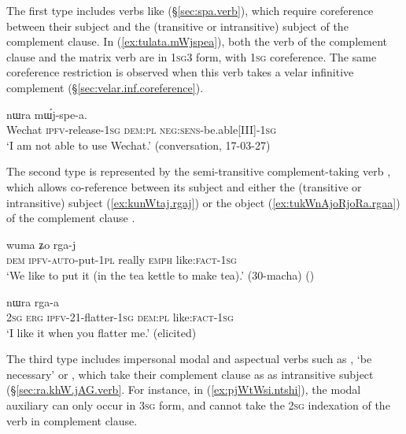 The first type includes verbs like  (§\ref{sec:spa.verb}), which require coreference between their subject and the (transitive or intransitive) subject of the complement clause. In (\ref{ex:tulata.mWjspea}), both the verb of the complement clause and the matrix verb are in \textsc{1sg}\fl{}3 form, with \textsc{1sg} coreference. The same coreference restriction is observed when this verb takes a velar infinitive complement (§\ref{sec:velar.inf.coreference}).
 
\begin{exe}
\ex \label{ex:tulata.mWjspea}
  nɯra mɯ́j-spe-a. \\
 Wechat \textsc{ipfv}-release-\textsc{1sg} \textsc{dem}:\textsc{pl} \textsc{neg}:\textsc{sens}-be.able[III]-\textsc{1sg} \\
 \glt `I am not able to use Wechat.' (conversation, 17-03-27)
  \end{exe}
 
The second type is represented by the semi-transitive complement-taking verb , which allows co-reference between its subject and either the (transitive or intransitive) subject (\ref{ex:kunWtaj.rgaj}) or the object (\ref{ex:tukWnAjoRjoRa.rgaa}) of the complement clause \citep[238]{jacques16complementation}. 
   
\begin{exe}
\ex \label{ex:kunWtaj.rgaj}
 \gll [nɯ ku-nɯ-ta-j] wuma ʑo rga-j   \\
 \textsc{dem} \textsc{ipfv}-\textsc{auto}-put-\textsc{1pl} really \textsc{emph} like:\textsc{fact}-\textsc{1sg} \\
 \glt `We like to put it (in the tea kettle to make tea).' (30-macha)
 ()
\end{exe}
     
 \begin{exe}
\ex \label{ex:tukWnAjoRjoRa.rgaa}
  nɯra rga-a \\
 \textsc{2sg} \textsc{erg} \textsc{ipfv}-2\fl{}1-flatter-\textsc{1sg} \textsc{dem}:\textsc{pl}  like:\textsc{fact}-\textsc{1sg}\\
\glt `I like it when you flatter me.' (elicited)
 \end{exe}
 
 The third type includes impersonal modal and aspectual verbs such as , `be necessary' or , which take their complement clause as as intransitive subject (§\ref{sec:ra.khW.jAG.verb}. For instance, in (\ref{ex:pjWtWsi.ntshi}), the modal auxiliary  can only occur in \textsc{3sg} form, and cannot take the \textsc{2sg} indexation of the verb in complement clause.
 
